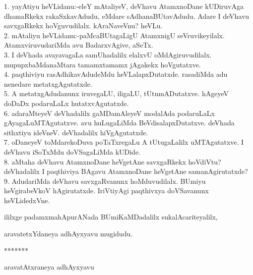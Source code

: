 \documentclass{article}
\begin{document}
1. yayAtiyu heVLidanu:-eleY mAtaliyeV, deVhavu AtamxnoDane kUDiruvAga dhamaRkekx rakaSxkavAdudu, eMdare sAdhanaBUtavAdudu. Adare I deVhavu savxgaRkekx hoVguvudilalx. kAraNaveVnu? heVLu.\\
2. mAtaliyu heVLidanu:-paMcaBUtagaLigU AtamxnigU seVruvikeyilalx. AtamxviruvudariMda avu BadarxvAgive, aSeTx.\\
3. I deVhada avayavagaLa samUhadalilx elalxvU oMdAgiruvudilalx. mupupxbaMdanaMtara tamamxtamamx jAgakekx hoVgutatxve.\\
4. paqthiviyu rasAdhikavAdudeMdu heVLalapxDutatxde. rasadiMda adu nenedare metatxgAgutatxde.\\
5. A metatxgAdudanunx iruvegaLU, iligaLU, tUtumADutatxve. hAgeyeV doDaDx podaruLaLx hutatxvAgutatxde.\\
6. adaraMteyeV deVhadalilx gaMDamAleyeV modalAda podaruLaLx gAyagaLuMTAgutatxve. avu huLugaLiMda BeVdisalapxDutatxve. deVhada sithxtiyu ideVneV. deVhadalilx hiVgAgutatxde.\\
7. oDaneyeV toMdarekoDuva poTaTxregaLu A tUtugaLalilx uMTAgutatxve. I deVhavu iSoTxMdu doVSagaLiMda kUDide.\\
8. aMtaha deVhavu AtamxnoDane heVgetAne savxgaRkekx hoVdiVtu? deVhadalilx I paqthiviya BAgavu AtamxnoDane heVgetAne samanAgirutatxde?\\
9. AdudariMda deVhavu savxgaRvanunx hoMduvudilalx. BUmiyu heVgirabeVkoV hAgirutatxde. IriVtiyAgi paqthivxya doVSavanunx heVLidedxVne.\\

\begin{center}
ililxge padamxmahApurANada BUmiKaMDadalilx sukalAcariteyalilx,
\end{center}

\begin{center}
aravatetxYdaneya adhAyxyavu mugidudu.
\end{center}

\begin{center}
*******
\end{center}

\begin{center}
aravatAtxraneya adhAyxyavu
\end{center}
\end{document}
